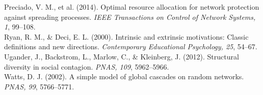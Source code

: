 \documentclass[11pt]{article}
\begin{document}
\begin{flushleft}
Preciado, V. M., et al. (2014). Optimal resource allocation for network protection against spreading processes. \textit{IEEE Transactions on Control of Network Systems, 1}, 99--108.\\[2pt]
Ryan, R. M., \& Deci, E. L. (2000). Intrinsic and extrinsic motivations: Classic definitions and new directions. \textit{Contemporary Educational Psychology, 25}, 54--67.\\[2pt]
Ugander, J., Backstrom, L., Marlow, C., \& Kleinberg, J. (2012). Structural diversity in social contagion. \textit{PNAS, 109}, 5962--5966.\\[2pt]
Watts, D. J. (2002). A simple model of global cascades on random networks. \textit{PNAS, 99}, 5766--5771.
\end{flushleft}
\end{document}
